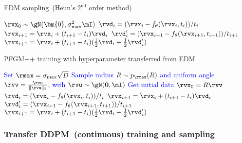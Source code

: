 \begin{minipage}{0.46\textwidth}
\vspace{-47pt}
\begin{algorithm}[H]
    \centering
    \caption{EDM sampling~(Heun’s $2^{\textrm{nd}}$ order method)}\label{algorithm-edm-sample}
    \begin{algorithmic}[1]
\STATE $\rvx_0 \sim \gN(\bm{0}, \sigma_{\textrm{max}}^2\mI)$
\STATE $\rvd_i = ({\rvx_i -f_{\theta}(\rvx_i,t_i)})/{t_i}$
\STATE $\rvx_{i+1} =\rvx_i + (t_{i+1}-t_i)\rvd_i$
\STATE $\rvd_i' = ({\rvx_{i+1} -f_{\theta}(\rvx_{i+1},t_{i+1})})/{t_{i+1}}$
\STATE $\rvx_{i+1}=\rvx_i + (t_{i+1}-t_i)(\frac12\rvd_i+\frac12\rvd_i')$
\ENDIF
\ENDFOR
    \end{algorithmic}
\end{algorithm}
\end{minipage}
\hfill
\begin{minipage}{0.50\textwidth}
\begin{algorithm}[H]
    \centering
    \caption{PFGM++ training with hyperparameter transferred from EDM}\label{algorithm-edm-pfgmpp-sample}
    \begin{algorithmic}[1]
 \STATE \textcolor{blue}{Set  $\rmax = \sigma_{\textrm{max}}\sqrt{D}$}
        \STATE  \textcolor{blue}{Sample radius $R \sim p_{\rmax}(R)$
       and uniform angle $\rvv =\frac{\rvu}{\|\rvu\|_2}$, with $\rvu \sim \gN(\bf{0}, \mI)$}
        \STATE \textcolor{blue}{Get initial data $\rvx_0 = R\rvv$}
\STATE $\rvd_i = ({\rvx_i -f_{\theta}(\rvx_i,t_i)})/{t_i}$
\STATE $\rvx_{i+1} =\rvx_i + (t_{i+1}-t_i)\rvd_i$
\STATE $\rvd_i' = ({\rvx_{i+1} -f_{\theta}(\rvx_{i+1},t_{i+1})})/{t_{i+1}}$
\STATE $\rvx_{i+1}=\rvx_i + (t_{i+1}-t_i)(\frac12\rvd_i+\frac12\rvd_i')$
\ENDIF
\ENDFOR
    \end{algorithmic}
\end{algorithm}
\end{minipage}

\subsubsection{Transfer DDPM~(continuous) training and sampling}


